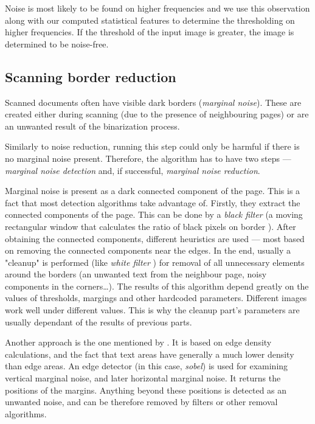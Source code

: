 Noise is most likely to be found on higher frequencies and we use this observation along with our computed statistical features to determine the thresholding on higher frequencies. If the threshold of the input image is greater, the image is determined to be noise-free. 

\subsection{Scanning border reduction}

Scanned documents often have visible dark borders (\emph{marginal noise}). These are created either during scanning (due to the presence of neighbouring pages) or are an unwanted result of the binarization process.

Similarly to noise reduction, running this step could only be harmful if there is no marginal noise present. Therefore, the algorithm has to have two steps --- \emph{marginal noise detection} and, if successful, \emph{marginal noise reduction}.

Marginal noise is present as a dark connected component of the page. This is a fact that most detection algorithms take advantage of. Firstly, they extract the connected components of the page. This can be done by a \emph{black filter} (a moving rectangular window that calculates the ratio of black pixels on border \citep{marginalNoiseWindow}). After obtaining the connected components, different heuristics are used --- most based on removing the connected components near the edges. In the end, usually a "cleanup" is performed (like \emph{white filter} \citep{marginalNoiseWindow}) for removal of all unnecessary elements around the borders (an unwanted text from the neighbour page, noisy components in the corners\ldots).
The results of this algorithm depend greatly on the values of thresholds, margings and other hardcoded parameters. Different images work well under different values. This is why the cleanup part's parameters are usually dependant of the results of previous parts.

Another approach is the one mentioned by \citet{marginalNoiseEdge}. It is based on edge density calculations, and the fact that text areas have generally a much lower density than edge areas. An edge detector (in this case, \emph{sobel}) is used for examining vertical marginal noise, and later horizontal marginal noise. It returns the positions of the margins. Anything beyond these positions is detected as an unwanted noise, and can be therefore removed by filters or other removal algorithms.

